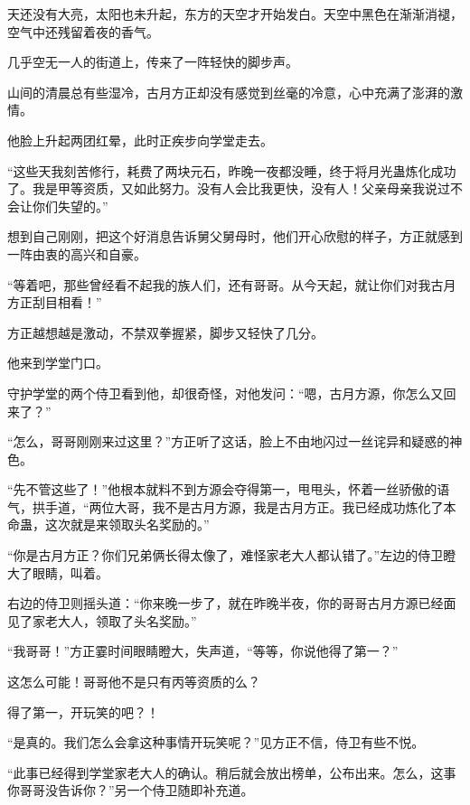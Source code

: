 
\begin{this_body}



天还没有大亮，太阳也未升起，东方的天空才开始发白。天空中黑色在渐渐消褪，空气中还残留着夜的香气。

几乎空无一人的街道上，传来了一阵轻快的脚步声。

山间的清晨总有些湿冷，古月方正却没有感觉到丝毫的冷意，心中充满了澎湃的激情。

他脸上升起两团红晕，此时正疾步向学堂走去。

“这些天我刻苦修行，耗费了两块元石，昨晚一夜都没睡，终于将月光蛊炼化成功了。我是甲等资质，又如此努力。没有人会比我更快，没有人！父亲母亲我说过不会让你们失望的。”

想到自己刚刚，把这个好消息告诉舅父舅母时，他们开心欣慰的样子，方正就感到一阵由衷的高兴和自豪。

“等着吧，那些曾经看不起我的族人们，还有哥哥。从今天起，就让你们对我古月方正刮目相看！”

方正越想越是激动，不禁双拳握紧，脚步又轻快了几分。

他来到学堂门口。

守护学堂的两个侍卫看到他，却很奇怪，对他发问：“嗯，古月方源，你怎么又回来了？”

“怎么，哥哥刚刚来过这里？”方正听了这话，脸上不由地闪过一丝诧异和疑惑的神色。

“先不管这些了！”他根本就料不到方源会夺得第一，甩甩头，怀着一丝骄傲的语气，拱手道，“两位大哥，我不是古月方源，我是古月方正。我已经成功炼化了本命蛊，这次就是来领取头名奖励的。”

“你是古月方正？你们兄弟俩长得太像了，难怪家老大人都认错了。”左边的侍卫瞪大了眼睛，叫着。

右边的侍卫则摇头道：“你来晚一步了，就在昨晚半夜，你的哥哥古月方源已经面见了家老大人，领取了头名奖励。”

“我哥哥！”方正霎时间眼睛瞪大，失声道，“等等，你说他得了第一？”

这怎么可能！哥哥他不是只有丙等资质的么？

得了第一，开玩笑的吧？！

“是真的。我们怎么会拿这种事情开玩笑呢？”见方正不信，侍卫有些不悦。

“此事已经得到学堂家老大人的确认。稍后就会放出榜单，公布出来。怎么，这事你哥哥没告诉你？”另一个侍卫随即补充道。


\end{this_body}
